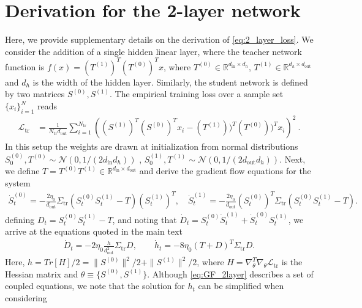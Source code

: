 \documentclass[a4paper,11pt]{article}
\newcommand{\alonb}[1]{}
\newcommand{\gradtheta}{\nabla_{\theta}}
\newcommand{\dout}{d_\mathrm{out}}
\newcommand{\din}{d_\mathrm{in}}
\newcommand{\training}{\mathrm{tr}}
\begin{document}

\section{Derivation for the 2-layer network}
\label{sec:app_2layer}

\alonb{TODO: Check all of the $din \times dout$ and etc.}Here, we provide supplementary details on the derivation of \cref{eq:2_layer_loss}.
We consider the addition of a single hidden linear layer, where the teacher network function is $f(x)= (T^{(1)})^T (T^{(0)})^T  x$, where $T^{(0)} \in \mathbb{R}^{ \din\times d_h}$, $T^{(1)} \in \mathbb{R}^{ d_h \times \dout}$ and $d_h$ is the width of the hidden layer. Similarly, the student network is defined by two matrices $S^{(0)}, S^{(1)}$. The empirical training loss over a sample set $\{x_i\}_{i=1}^N$ reads
\begin{align}
    \mathcal{L}_\training 
    &= 
    \frac{1}{N_\training \dout}
    \sum_{i=1}^{N_\training }
    \left( 
    (S^{(1)} )^T (S^{(0)} )^T  x_i 
    -( T^{(1)} ) )^T (T^{(0)} ) )^Tx_i
    \right)^2\ .
\end{align}
In this setup the weights are drawn at initialization from normal distributions $S^{(0)}_0, T^{(0)} \sim \mathcal{N}(0,1/({2 \din }d_{h}))$ , $S_0^{(1)}, T^{(1)} \sim \mathcal{N}(0,1/({2 \dout }d_{h}))$. 
Next, we define $T= T^{(0)} T^{(1)} \in \mathbb{R}^{\din \times \dout }$ and derive the gradient flow equations for the system 
\begin{align}
    \dot{S}_t^{(0)}
    =
    -\frac{2\eta_0}{\dout} 
     \Sigma_\training  
     \left( 
    S^{(0)}_t S^{(1)}_t   
    - T
    \right) 
    (S^{(1)}_t)^T
    ,
    \quad
     \dot{S}_t^{(1)}
    =
    -\frac{2\eta_0}{\dout} 
    (S^{(0)}_t ) ^T
     \Sigma_\training 
     \left( 
      S^{(0)}_t S^{(1)}_t
    - T
    \right).
\end{align}
defining $D_t= S_t^{(0)}S_t^{(1)}  - T$, and noting that 
$\dot{D}_t=  S_t^{(0)}\dot{S}_t^{(1)} +  \dot{S}_t^{(0)}S_t^{(1)}$, we arrive at the equations quoted in the main text
\begin{align}
    \dot{D}_t
    =
    -
    2\eta_0 \frac{h}{d_\mathrm{out}^2}  \Sigma_\training  D 
    ,
    \qquad
    \dot{h}_t
    =
    -8\eta_0 (T+D)^T \Sigma_\training D.
\end{align}
Here, $h=Tr[H]/2=\|S^{(0)}\|^2/2 + \|S^{(1)}\|^2/2$, where $H=\gradtheta^T \gradtheta \mathcal{L}_\training$ is the Hessian matrix and $\theta\equiv\{S^{(0)},S^{(1)}\}$.
Although \cref{eq:GF_2layer} describes a set of coupled equations, we note that the solution for $h_t$ can be simplified when considering
\end{document}
